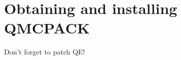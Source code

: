 \chapter{Obtaining and installing QMCPACK}
\label{chap:obtaininginstalling}

Don't forget to patch QE!
